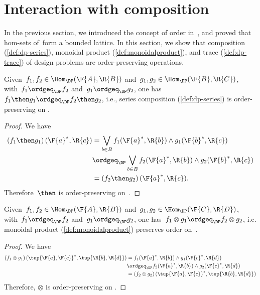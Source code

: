 

\section{Interaction with composition}


In the previous section, we introduced the concept of order in~\DP, and proved that hom-sets of~\DP form a bounded lattice. In this section, we show that composition (\cref{def:dp-series}), monoidal product (\cref{def:monoidalproduct}), and trace (\cref{def:dp-trace}) of design problems are order-preserving operations.
\begin{lemma}
  Given~$f_1,f_2 \in \Hom_\DP(\F{A},\R{B})$ and~$g_1,g_2 \in \Hom_\DP(\F{B},\R{C})$, with~$f_1\ordgeq_\DP f_2$ and~$g_1\ordgeq_\DP g_2$, one has~$f_1\then g_1 \ordgeq_\DP f_2\then g_2$, i.e., series composition (\cref{def:dp-series}) is order-preserving on \DP.
\end{lemma}

\begin{proof}
  We have
  \begin{equation}
    \begin{aligned}
      \left( f_1\then g_1\right)(\F{a}^*,\R{c})&=\bigvee_{b\in B}f_1(\F{a}^*,\R{b})\wedge g_1(\F{b}^*,\R{c})\\
      &\ordgeq_\DP \bigvee_{b\in B} f_2(\F{a}^*,\R{b})\wedge g_2(\F{b}^*,\R{c})\\
      &=\left( f_2\then g_2\right)(\F{a}^*,\R{c}).
    \end{aligned}
  \end{equation}
  Therefore~$\then$ is order-preserving on~\DP.
\end{proof}

\begin{lemma}
  Given~$f_1,f_2 \in \Hom_\DP(\F{A},\R{B})$ and~$g_1,g_2 \in \Hom_\DP(\F{C},\R{D})$, with~$f_1\ordgeq_\DP f_2$ and~$g_1\ordgeq_\DP g_2$, one has~$f_1\otimes g_1 \ordgeq_\DP f_2\otimes g_2$, i.e. monoidal product (\cref{def:monoidalproduct}) preserves order on~\DP.
\end{lemma}

\begin{proof}
  We have
  \begin{equation}
    \begin{aligned}
      \left( f_1\otimes g_1\right) (\tup{\F{a},\F{c}}^*,\tup{\R{b},\R{d}})&=f_1(\F{a}^*,\R{b})\wedge g_1(\F{c}^*,\R{d})\\
      &\ordgeq_\DP f_2(\F{a}^*,\R{b})\wedge g_2(\F{c}^*,\R{d})\\
      &=\left( f_2\otimes g_2\right) (\tup{\F{a},\F{c}}^*,\tup{\R{b},\R{d}})
    \end{aligned}
  \end{equation}
  Therefore, $\otimes$ is order-preserving on \DP.
\end{proof}

